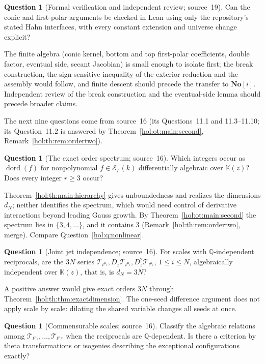 \documentclass[11pt]{article}
\numberwithin{equation}{section}
\theoremstyle{definition}
\newtheorem{question}[theorem]{Question}
\theoremstyle{remark}
\newcommand{\Q}{\mathbb Q}
\newcommand{\No}{\mathbf{No}}
\newcommand{\KK}{\mathbb K}
\newcommand{\EK}{\mathcal E_\Gamma(k)}
\begin{document}
\begin{question}[Formal verification and independent review; source~19]
\label{hol:nr:q:formal}
Can the conic and first-polar arguments be checked in Lean using only the
repository's stated Hahn interfaces, with every constant extension and
universe change explicit?
\end{question}

The finite algebra (conic kernel, bottom and top first-polar coefficients,
double factor, eventual side, secant Jacobian) is small enough to isolate
first; the break construction, the sign-sensitive inequality of the exterior
reduction and the assembly would follow, and finite descent should precede
the transfer to $\No[i]$. Independent review of the break construction and the
eventual-side lemma should precede broader claims.

The next nine questions come from source~16 (its Questions~11.1 and
11.3--11.10; its Question~11.2 is answered by
Theorem~\ref{hol:ot:main:second}, Remark~\ref{hol:th:rem:ordertwo}).

\begin{question}[The exact order spectrum; source~16]\label{hol:th:q:spectrum}
Which integers occur as $\operatorname{dord}(f)$ for nonpolynomial $f\in\EK$
differentially algebraic over $\KK(z)$? Does every integer $r\ge3$ occur?
\end{question}

Theorem~\ref{hol:th:main:hierarchy} gives unboundedness and realizes the
dimensions $d_N$; neither identifies the spectrum, which would need control of
derivative interactions beyond leading Gauss growth. By
Theorem~\ref{hol:ot:main:second} the spectrum lies in $\{3,4,\ldots\}$, and it
contains $3$ (Remark~\ref{hol:th:rem:ordertwo}, merge). Compare
Question~\ref{hol:q:nonlinear}.

\begin{question}[Joint jet independence; source~16]\label{hol:th:q:joint}
For scales with $\Q$-independent reciprocals, are the $3N$ series
$\mathcal T_{t^{\mu_i}},D_z\mathcal T_{t^{\mu_i}},D_z^2\mathcal T_{t^{\mu_i}}$,
$1\le i\le N$, algebraically independent over $\KK(z)$, that is, is $d_N=3N$?
\end{question}

A positive answer would give exact orders $3N$ through
Theorem~\ref{hol:th:thm:exactdimension}. The one-seed difference argument does
not apply scale by scale: dilating the shared variable changes all seeds at
once.

\begin{question}[Commensurable scales; source~16]\label{hol:th:q:commensurable}
Classify the algebraic relations among $\mathcal T_{t^{\mu_1}},\ldots,
\mathcal T_{t^{\mu_N}}$ when the reciprocals are $\Q$-dependent. Is there a
criterion by theta transformations or isogenies describing the exceptional
configurations exactly?
\end{question}
\end{document}
